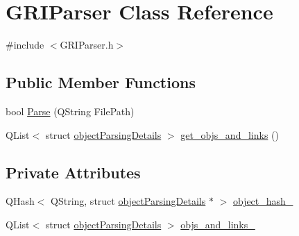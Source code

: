 \hypertarget{classGRIParser}{\section{\-G\-R\-I\-Parser \-Class \-Reference}
\label{classGRIParser}
}


{\ttfamily \#include $<$\-G\-R\-I\-Parser.\-h$>$}

\subsection*{\-Public \-Member \-Functions}
\begin{DoxyCompactItemize}
\item 
bool \hyperlink{classGRIParser_a72a0cd547d59ec5690685f8881c775cb}{\-Parse} (\-Q\-String \-File\-Path)
\item 
\-Q\-List$<$ struct \*
\hyperlink{structobjectParsingDetails}{object\-Parsing\-Details} $>$ \hyperlink{classGRIParser_ab51e4d92e2673a047904fb1c38c5ad4e}{get\-\_\-objs\-\_\-and\-\_\-links} ()
\end{DoxyCompactItemize}
\subsection*{\-Private \-Attributes}
\begin{DoxyCompactItemize}
\item 
\-Q\-Hash$<$ \-Q\-String, struct \*
\hyperlink{structobjectParsingDetails}{object\-Parsing\-Details} $\ast$ $>$ \hyperlink{classGRIParser_ab99d6201699aaaea0b2b853661fb43c7}{object\-\_\-hash\-\_\-}
\item 
\-Q\-List$<$ struct \*
\hyperlink{structobjectParsingDetails}{object\-Parsing\-Details} $>$ \hyperlink{classGRIParser_a5a873d2c2129c4c4758ebaa23b651e73}{objs\-\_\-and\-\_\-links\-\_\-}
\end{DoxyCompactItemize}


